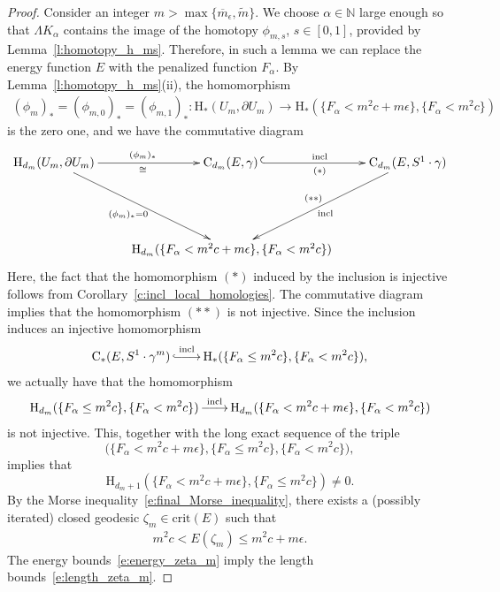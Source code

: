 \documentclass[reqno]{amsart}
\numberwithin{equation}{section}
\theoremstyle{personal}%
\theoremstyle{definition}
\newcommand{\N}{\mathds{N}}
\newcommand{\incl}{\mathrm{incl}}
\newcommand{\crit}{\mathrm{crit}}
\newcommand{\Hom}{\mathrm{H}}
\newcommand{\Loc}{\mathrm{C}}
\DeclareRobustCommand{\llonghookrightarrow}{\lhook\joinrel\relbar\joinrel\relbar\joinrel\rightarrow}
\DeclareRobustCommand{\llongrightarrow}{\relbar\joinrel\relbar\joinrel\rightarrow}
\DeclareMathOperator*{\ttoup}{\llongrightarrow}
\DeclareMathOperator*{\eembup}{\llonghookrightarrow}
\begin{document}
\begin{proof}
Consider an integer $m>  \max\{\overline m_\epsilon,\tilde m\}$. We choose $\alpha\in\N$ large enough so that $\Lambda K_\alpha$ contains the image of the homotopy $\phi_{m,s}$, $s\in[0,1]$, provided by Lemma~\ref{l:homotopy_h_ms}. Therefore, in such a lemma we can replace the energy function $E$ with the penalized function $F_\alpha$. By Lemma~\ref{l:homotopy_h_ms}(ii),  the homomorphism
\begin{align*}
  (\phi_{m})_*=(\phi_{m,0})_*=(\phi_{m,1})_*:
  \Hom_*(U_m,\partial U_m) 
 \to 
 \Hom_*(\{F_\alpha<m^2c+m\epsilon\},\{F_\alpha<m^2c\})
\end{align*}
is the zero one, and we have the commutative diagram
\begin{align*}
\xymatrix{
\Hom_{d_m}(U_m,\partial U_m)
\ar[r]_{\cong}^{(\phi_m)_*}
\ar[ddr]_{(\phi_m)_*=0\ }
&
\Loc_{d_m}(E,\gamma)\,
\ar@{^{(}->}[r]^{\incl}_{(*)}
&
\Loc_{d_m}(E,S^1\cdot\gamma)
\ar[ddl]^{\incl}_{(**)}
\\\\
&
\Hom_{d_m}(\{F_\alpha<m^2c+m\epsilon\},\{F_\alpha<m^2c\})
&
} 
\end{align*}
Here, the fact that the homomorphism $(*)$ induced by the inclusion is injective follows from Corollary~\ref{c:incl_local_homologies}. The commutative diagram implies that the homomorphism $(**)$ is not injective. Since the inclusion induces an injective homomorphism 
\begin{align*}
\Loc_*(E,S^1\cdot\gamma^m) \eembup^{\incl} \Hom_*(\{F_\alpha\leq m^2c\},\{F_\alpha<m^2c\}),
\end{align*}
we actually have that the homomorphism 
\begin{align*}
 \Hom_{d_m}(\{F_\alpha\leq m^2c\},\{F_\alpha<m^2c\}) \ttoup^{\incl} \Hom_{d_m}(\{F_\alpha<m^2c+m\epsilon\},\{F_\alpha<m^2c\})
\end{align*}
is not injective. This, together with the long exact sequence of the triple 
\[\big(\{F_\alpha<m^2c+m\epsilon\},\{F_\alpha\leq m^2c\},\{F_\alpha<m^2c\}\big),\] 
implies that
\[\Hom_{d_m+1}(\{F_\alpha<m^2c+m\epsilon\},\{F_\alpha\leq m^2c\})\neq0.\] 
By the Morse inequality~\eqref{e:final_Morse_inequality}, there exists a (possibly iterated) closed geodesic $\zeta_m\in\crit(E)$ such that
\begin{gather}
\label{e:energy_zeta_m}
m^2c < E(\zeta_m) \leq m^2c+m\epsilon.
\end{gather}
The energy bounds~\eqref{e:energy_zeta_m} imply the length bounds~\eqref{e:length_zeta_m}.
\end{proof}
\end{document}
